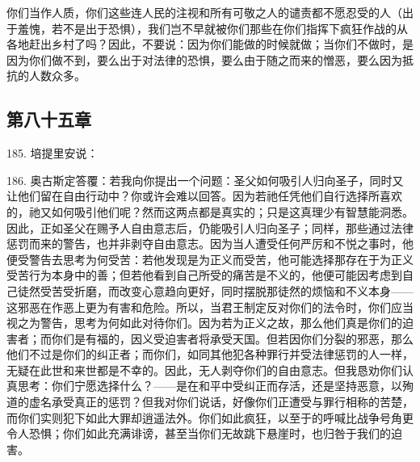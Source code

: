 你们当作人质，你们这些连人民的注视和所有可敬之人的谴责都不愿忍受的人（出于羞愧，若不是出于恐惧），我们岂不早就被你们那些在你们指挥下疯狂作战的从各地赶出乡村了吗？因此，不要说：因为你们能做的时候就做；当你们不做时，是因为你们做不到，要么出于对法律的恐惧，要么由于随之而来的憎恶，要么因为抵抗的人数众多。\par


\subsection{第八十五章}

185. 培提里安说：\par

186. 奥古斯定答覆：若我向你提出一个问题：圣父如何吸引人归向圣子，同时又让他们留在自由行动中？你或许会难以回答。因为若祂任凭他们自行选择所喜欢的，祂又如何吸引他们呢？然而这两点都是真实的；只是这真理少有智慧能洞悉。因此，正如圣父在赐予人自由意志后，仍能吸引人归向圣子；同样，那些通过法律惩罚而来的警告，也并非剥夺自由意志。因为当人遭受任何严厉和不悦之事时，他便受警告去思考为何受苦：若他发现是为正义而受苦，他可能选择那存在于为正义受苦行为本身中的善；但若他看到自己所受的痛苦是不义的，他便可能因考虑到自己徒然受苦受折磨，而改变心意趋向更好，同时摆脱那徒然的烦恼和不义本身——这邪恶在作恶上更为有害和危险。所以，当君王制定反对你们的法令时，你们应当视之为警告，思考为何如此对待你们。因为若为正义之故，那么他们真是你们的迫害者；而你们是有福的，因义受迫害者将承受天国。但若因你们分裂的邪恶，那么他们不过是你们的纠正者；而你们，如同其他犯各种罪行并受法律惩罚的人一样，无疑在此世和来世都是不幸的。因此，无人剥夺你们的自由意志。但我恳劝你们认真思考：你们宁愿选择什么？——是在和平中受纠正而存活，还是坚持恶意，以殉道的虚名承受真正的惩罚？但我对你们说话，好像你们正遭受与罪行相称的苦楚，而你们实则犯下如此大罪却逍遥法外。你们如此疯狂，以至于的呼喊比战争号角更令人恐惧；你们如此充满诽谤，甚至当你们无故跳下悬崖时，也归咎于我们的迫害。\par

